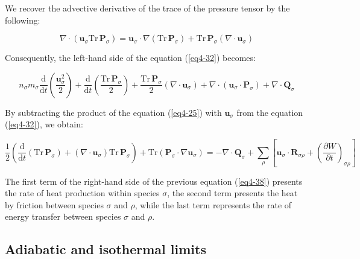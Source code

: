 We recover the advective derivative of the trace of the pressure tensor by the following: 

\vspace*{-3.25pt}

\begin{equation}
    \nabla\cdot\left(\mathbf{u}_\sigma\mathrm{Tr}\,\mathbf{P}_\sigma\right)=\mathbf{u}_\sigma\cdot\nabla\left(\mathrm{Tr}\,\mathbf{P}_\sigma\right)+\mathrm{Tr}\,\mathbf{P}_\sigma(\nabla\cdot\mathbf{u}_\sigma)
\end{equation}

Consequently, the left-hand side of the equation (\ref{eq4-32}) becomes:

\vspace*{-4pt}

\begin{equation}
    n_\sigma m_\sigma\frac{\mathrm{d}}{\mathrm{d}t}\left(\frac{\mathbf{u}_\sigma^2}{2}\right)+\frac{\mathrm{d}}{\mathrm{d}t}\left(\frac{\mathrm{Tr}\,\mathbf{P}_\sigma}{2}\right)+\frac{\mathrm{Tr}\,\mathbf{P}_\sigma}{2}(\nabla\cdot\mathbf{u}_\sigma)+\nabla\cdot\left(\mathbf{u}_\sigma\cdot\mathbf{P}_\sigma\right)+\nabla\cdot\mathbf{Q}_\sigma
\end{equation}

By subtracting the product of the equation (\ref{eq4-25}) with $\mathbf{u}_\sigma$ from the equation (\ref{eq4-32}), we obtain:

\vspace*{-10pt}

\begin{equation}
    \label{eq4-38}
    \frac{1}{2}\left(\frac{\mathrm{d}}{\mathrm{d}t}\left(\mathrm{Tr}\,\mathbf{P}_\sigma\right)+(\nabla\cdot\mathbf{u}_\sigma)\mathrm{Tr}\,\mathbf{P}_\sigma\right)+{\mathrm{Tr}\left(\mathbf{P}_\sigma\cdot\nabla\mathbf{u}_\sigma\right)}=-\nabla\cdot\mathbf{Q}_\sigma+\sum_{\rho}\left[\mathbf{u}_\sigma\cdot\mathbf{R}_{\sigma\rho}+\left(\frac{\partial W}{\partial t}\right)_{\sigma\rho}\right]
\end{equation}

The first term of the right-hand side of the previous equation (\ref{eq4-38}) presents the rate of heat production within species $\sigma$, the second term presents the heat by friction between species $\sigma$ and $\rho$, while the last term represents the rate of energy transfer between species $\sigma$ and $\rho$.

\subsection{Adiabatic and isothermal limits}

